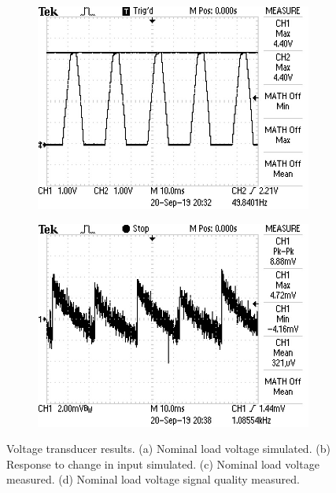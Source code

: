 \begin{figure} [!ht]
\begin{subfigure}[]{0.4\textwidth}
  		\includegraphics[width=1\linewidth]{./Figures/vtrans_meas_nom.JPG}
		    \caption{} \label{subfig:vtrans_meas_nom}
     \end{subfigure}
          \begin{subfigure}[]{0.4\textwidth}
             \centering
  		\includegraphics[width=1.0\linewidth]{./Figures/vtrans_meas_noise.JPG}
		   \caption{ } \label{subfig:vtrans_meas_noise}
     \end{subfigure}
     \caption[Voltage transducer measurement results]{Voltage transducer results. (a) Nominal load voltage simulated. (b) Response to change in input simulated. (c) Nominal load voltage measured. (d) Nominal load voltage signal quality measured.} \label{fig:vtrans_results}
\end{figure}

